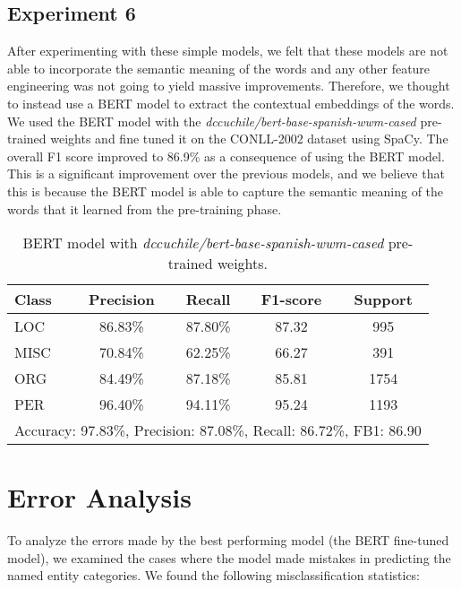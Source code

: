 \documentclass[12pt]{report}
\begin{document}
\subsection*{Experiment 6}

After experimenting with these simple models, we felt that these models are not able to incorporate the semantic meaning of the words and any other feature engineering was not going to yield massive improvements. Therefore, we thought to instead use a BERT model to extract the contextual embeddings of the words. We used the BERT model with the \textit{dccuchile/bert-base-spanish-wwm-cased} pre-trained weights and fine tuned it on the CONLL-2002 dataset using SpaCy. The overall F1 score improved to 86.9\% as a consequence of using the BERT model. This is a significant improvement over the previous models, and we believe that this is because the BERT model is able to capture the semantic meaning of the words that it learned from the pre-training phase.

\begin{table}[h]
	\centering
	\label{tab:exp6}

	\begin{tabular}{lcccc}
		\hline
		\textbf{Class} & \textbf{Precision} & \textbf{Recall} & \textbf{F1-score} & \textbf{Support} \\ \hline
		LOC            & 86.83\%            & 87.80\%         & 87.32             & 995              \\ \hline
		MISC           & 70.84\%            & 62.25\%         & 66.27             & 391              \\ \hline
		ORG            & 84.49\%            & 87.18\%         & 85.81             & 1754             \\ \hline
		PER            & 96.40\%            & 94.11\%         & 95.24             & 1193             \\ \hline
		\hline
		\multicolumn{5}{c}{Accuracy: 97.83\%, Precision: 87.08\%, Recall: 86.72\%, FB1: 86.90}       \\ \hline
	\end{tabular}
	\caption{BERT model with \textit{dccuchile/bert-base-spanish-wwm-cased} pre-trained weights.}
\end{table}

\section*{Error Analysis}

To analyze the errors made by the best performing model (the BERT fine-tuned model), we examined the cases where the model made mistakes in predicting the named entity categories. We found the following misclassification statistics:
\end{document}
